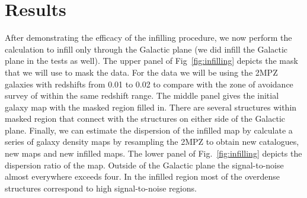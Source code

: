 \documentclass[useAMS,usenatbib]{mn2e}
\begin{document}
\section{Results}
\label{sec:results}

After demonstrating the efficacy of the infilling procedure, we now
perform the calculation to infill only through the Galactic plane (we
did infill the Galactic plane in the tests as well).  The upper panel
of Fig~\ref{fig:infilling} depicts the mask that we will use to mask
the data.  For the data we will be using the 2MPZ galaxies with
redshifts from 0.01 to 0.02 to compare with the zone of avoidance
survey of \citet{2016AJ....151...52S} within the same redshift
range. The middle panel gives the initial galaxy map with the masked
region filled in.  There are several structures within masked region
that connect with the structures on either side of the Galactic plane.
Finally, we can estimate the dispersion of the infilled map by
calculate a series of galaxy density maps by resampling the 2MPZ to
obtain new catalogues, new maps and new infilled maps.  The lower
panel of Fig.~\ref{fig:infilling} depicts the dispersion ratio of the
map.  Outside of the Galactic plane the signal-to-noise almost
everywhere exceeds four.  In the infilled region most of the overdense
structures correspond to high signal-to-noise regions.
\end{document}
